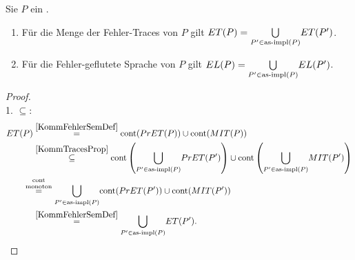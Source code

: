 \begin{Prop}
  \label{KommSemProp}
  Sie $P$ ein \MEIO{}.
  \begin{enumerate}
    \item Für die Menge der Fehler-Traces von $P$ gilt $ET (P) =
      \underset{P'\in\mathrm{as}\text{-}\mathrm{impl} (P)}{\bigcup} ET (P')$.
    \item Für die Fehler-geflutete Sprache von $P$ gilt $EL (P) =
      \underset{P'\in\mathrm{as}\text{-}\mathrm{impl} (P)}{\bigcup} EL (P')$.
  \end{enumerate}
\end{Prop}
\begin{proof}\mbox{}\\
  1. \glqq$\subseteq$\grqq{}:
  {\allowdisplaybreaks
  \begin{align*}
    \ET (P)&\overset{\ref{KommFehlerSemDef}}{=} \cont (\PrET (P))\cup \cont
    (\MIT (P))\\
    &\overset{\ref{KommTracesProp}}{\subseteq} \cont
    \left(\underset{P'\in\asimp (P)}{\bigcup} \PrET (P')\right)\cup \cont
    \left(\underset{P'\in\asimp (P)}{\bigcup} \MIT (P')\right)\\
    &\hspace{-0.4cm}\overset{\cont}{\overset{\text{monoton}}{=}}
    \underset{P'\in\asimp (P)}{\bigcup} \cont (\PrET (P'))\cup \cont (\MIT
    (P'))\\
    &\overset{\ref{KommFehlerSemDef}}{=} \underset{P'\in\asimp
    (P)}{\bigcup} \ET (P').
  \end{align*}}


\end{proof}
